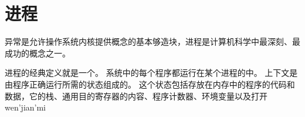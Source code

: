 
\section{进程}
{
    异常是允许操作系统内核提供概念的基本够造块，进程是计算机科学中最深刻、最成功的概念之一。

    进程的经典定义就是一个。
    系统中的每个程序都运行在某个进程的中。
    上下文是由程序正确运行所需的状态组成的。
    这个状态包括存放在内存中的程序的代码和数据，它的栈、通用目的寄存器的内容、程序计数器、环境变量以及打开wen'jian'mi
}
